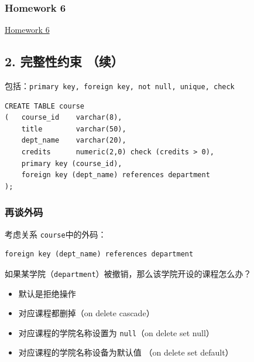 \documentclass[aspectratio=169, 14pt]{beamer}
\begin{document}
\begin{frame}
	\frametitle{Homework 6}

	\href{https://github.com/ChenZhongPu/db-swufe/tree/master/07_sql}{Homework 6}

\end{frame}

\begin{frame}
	\section{\textcolor{darkmidnightblue}{2. 完整性约束 （续）}}
	包括：\texttt{primary key, foreign key, not null, unique, check}

\end{frame}

\begin{frame}[fragile]

	\begin{verbatim}
CREATE TABLE course
(   course_id    varchar(8), 
    title        varchar(50), 
    dept_name    varchar(20),
    credits      numeric(2,0) check (credits > 0),
    primary key (course_id),
    foreign key (dept_name) references department
);
    \end{verbatim}

\end{frame}

\begin{frame}[fragile]
	\frametitle{再谈外码}

	考虑关系 \texttt{course}中的外码：

	\begin{verbatim}
foreign key (dept_name) references department 
\end{verbatim}

	{\large {}}  如果某学院（\texttt{department}）被撤销，那么该学院开设的课程怎么办？
	\pause
	\begin{itemize}
		\item 默认是拒绝操作
		\item 对应课程都删掉（\alert{on delete cascade}）
		\item 对应课程的学院名称设置为 \texttt{null}（\alert{on delete set null}）
		\item 对应课程的学院名称设备为默认值 （\alert{on delete set default}）
	\end{itemize}

\end{frame}
\end{document}
